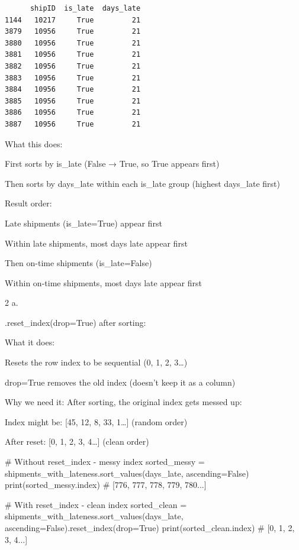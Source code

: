 \documentclass[
  letterpaper,
  DIV=11,
  numbers=noendperiod]{scrartcl}
\newenvironment{Shaded}{\begin{snugshade}}{\end{snugshade}}
\newcommand{\BuiltInTok}[1]{\textcolor[rgb]{0.00,0.23,0.31}{#1}}
\newcommand{\CommentTok}[1]{\textcolor[rgb]{0.37,0.37,0.37}{#1}}
\newcommand{\NormalTok}[1]{\textcolor[rgb]{0.00,0.23,0.31}{#1}}
\newcommand{\OperatorTok}[1]{\textcolor[rgb]{0.37,0.37,0.37}{#1}}
\newcommand{\StringTok}[1]{\textcolor[rgb]{0.13,0.47,0.30}{#1}}
\newcommand{\VariableTok}[1]{\textcolor[rgb]{0.07,0.07,0.07}{#1}}
\begin{document}
\begin{verbatim}
      shipID  is_late  days_late
1144   10217     True         21
3879   10956     True         21
3880   10956     True         21
3881   10956     True         21
3882   10956     True         21
3883   10956     True         21
3884   10956     True         21
3885   10956     True         21
3886   10956     True         21
3887   10956     True         21
\end{verbatim}

What this does:

First sorts by is\_late (False → True, so True appears first)

Then sorts by days\_late within each is\_late group (highest days\_late
first)

Result order:

Late shipments (is\_late=True) appear first

Within late shipments, most days late appear first

Then on-time shipments (is\_late=False)

Within on-time shipments, most days late appear first

2 a.

.reset\_index(drop=True) after sorting:

What it does:

Resets the row index to be sequential (0, 1, 2, 3\ldots)

drop=True removes the old index (doesn't keep it as a column)

Why we need it: After sorting, the original index gets messed up:

Index might be: {[}45, 12, 8, 33, 1\ldots{]} (random order)

After reset: {[}0, 1, 2, 3, 4\ldots{]} (clean order)

\begin{Shaded}
\begin{Highlighting}[]
\CommentTok{\# Without reset\_index {-} messy index}
\NormalTok{sorted\_messy }\OperatorTok{=}\NormalTok{ shipments\_with\_lateness.sort\_values(}\StringTok{\textquotesingle{}days\_late\textquotesingle{}}\NormalTok{, ascending}\OperatorTok{=}\VariableTok{False}\NormalTok{)}
\BuiltInTok{print}\NormalTok{(sorted\_messy.index)  }\CommentTok{\# [776, 777, 778, 779, 780...]}

\CommentTok{\# With reset\_index {-} clean index  }
\NormalTok{sorted\_clean }\OperatorTok{=}\NormalTok{ shipments\_with\_lateness.sort\_values(}\StringTok{\textquotesingle{}days\_late\textquotesingle{}}\NormalTok{, ascending}\OperatorTok{=}\VariableTok{False}\NormalTok{).reset\_index(drop}\OperatorTok{=}\VariableTok{True}\NormalTok{)}
\BuiltInTok{print}\NormalTok{(sorted\_clean.index)  }\CommentTok{\# [0, 1, 2, 3, 4...]}
\end{Highlighting}
\end{Shaded}
\end{document}
